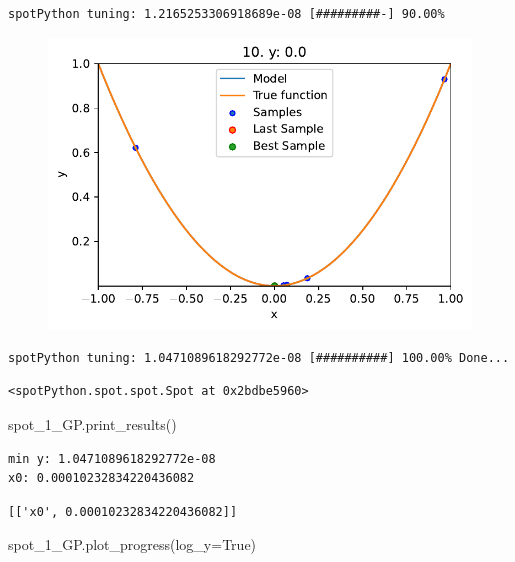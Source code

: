 \documentclass[
  letterpaper,
  DIV=11,
  numbers=noendperiod]{scrreprt}
\newenvironment{Shaded}{\begin{snugshade}}{\end{snugshade}}
\newcommand{\NormalTok}[1]{\textcolor[rgb]{0.00,0.23,0.31}{#1}}
\newcommand{\OperatorTok}[1]{\textcolor[rgb]{0.37,0.37,0.37}{#1}}
\newcommand{\VariableTok}[1]{\textcolor[rgb]{0.07,0.07,0.07}{#1}}
\begin{document}
\begin{verbatim}
spotPython tuning: 1.2165253306918689e-08 [#########-] 90.00% 
\end{verbatim}

\begin{figure}[H]

{\centering \includegraphics{04_spot_sklearn_surrogate_files/figure-pdf/cell-25-output-14.pdf}

}

\end{figure}

\begin{verbatim}
spotPython tuning: 1.0471089618292772e-08 [##########] 100.00% Done...
\end{verbatim}

\begin{verbatim}
<spotPython.spot.spot.Spot at 0x2bdbe5960>
\end{verbatim}

\begin{Shaded}
\begin{Highlighting}[]
\NormalTok{spot\_1\_GP.print\_results()}
\end{Highlighting}
\end{Shaded}

\begin{verbatim}
min y: 1.0471089618292772e-08
x0: 0.00010232834220436082
\end{verbatim}

\begin{verbatim}
[['x0', 0.00010232834220436082]]
\end{verbatim}

\begin{Shaded}
\begin{Highlighting}[]
\NormalTok{spot\_1\_GP.plot\_progress(log\_y}\OperatorTok{=}\VariableTok{True}\NormalTok{)}
\end{Highlighting}
\end{Shaded}
\end{document}
